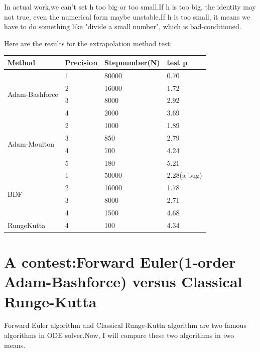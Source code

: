 \documentclass[UTF8]{ctexart}
\theoremstyle{plain}
\theoremstyle{definition}
\theoremstyle{remark}
\begin{document}
In actual work,we can't set h too big or too small.If h is too big, the identity may not true, even the numerical form maybe unstable.If h is too small, it means we have to do something like "divide a small number", which is bad-conditioned.

Here are the results for the extrapolation method test:
\begin{table}[H]
\centering
\begin{tabular}{|l|l|l|l|}
\hline
Method                          & Precision & Stepnumber(N) & test p      \\ \hline
\multirow{4}{*}{Adam-Bashforce} & 1         & 80000         & 0.70        \\ \cline{2-4} 
                                & 2         & 16000         & 1.72        \\ \cline{2-4} 
                                & 3         & 8000          & 2.92        \\ \cline{2-4} 
                                & 4         & 2000          & 3.69        \\ \hline
\multirow{4}{*}{Adam-Moulton}   & 2         & 1000          & 1.89        \\ \cline{2-4} 
                                & 3         & 850           & 2.79        \\ \cline{2-4} 
                                & 4         & 700           & 4.24        \\ \cline{2-4} 
                                & 5         & 180           & 5.21        \\ \hline
\multirow{4}{*}{BDF}            & 1         & 50000         & 2.28(a bug) \\ \cline{2-4} 
                                & 2         & 16000         & 1.78        \\ \cline{2-4} 
                                & 3         & 8000          & 2.71        \\ \cline{2-4} 
                                & 4         & 1500          & 4.68        \\ \hline
RungeKutta                      & 4         & 100           & 4.34        \\ \hline
\end{tabular}
\end{table}
\section{A contest:Forward Euler(1-order Adam-Bashforce) versus Classical Runge-Kutta}
Forward Euler algorithm and Classical Runge-Kutta algorithm are two famous algorithms in ODE solver.Now, I will compare these two algorithms in two means.
\end{document}
